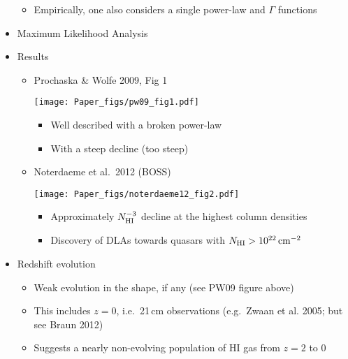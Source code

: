 \documentclass[12pt,letterpaper]{article}
\begin{document}
\begin{Aenumerate}
\begin{itemize}
\begin{itemize}
\begin{itemize}
      \end{itemize}
    \item Empirically, one also considers a single power-law
    and $\Gamma$ functions
    \end{itemize}

  \item Maximum Likelihood Analysis
  \item Results
    \begin{itemize}
    \item Prochaska \& Wolfe 2009, Fig 1

  \texttt{[image: Paper\_figs/pw09\_fig1.pdf]}

      \begin{itemize}
      \item Well described with a broken power-law 
      \item With a steep decline (too steep)
      \end{itemize}
    \item Noterdaeme et al.\ 2012 (BOSS)

  \texttt{[image: Paper\_figs/noterdaeme12\_fig2.pdf]}

      \begin{itemize}
      \item Approximately $N_{\rm HI}^{-3}$ decline at the highest column densities
      \item Discovery of DLAs towards quasars with $N_{\rm HI} > 10^{22} \, {\rm cm^{-2}}$
      \end{itemize}


    \end{itemize}

  \item Redshift evolution
    \begin{itemize}
    \item Weak evolution in the shape, if any (see PW09 figure above)
    \item This includes $z=0$, i.e.\ 21\,cm observations 
    (e.g.\ Zwaan et al. 2005; but see Braun 2012)
    \item Suggests a nearly non-evolving population of HI gas from $z=2$ to 0
    \end{itemize}

  \end{itemize}


\end{Aenumerate}
\end{document}
